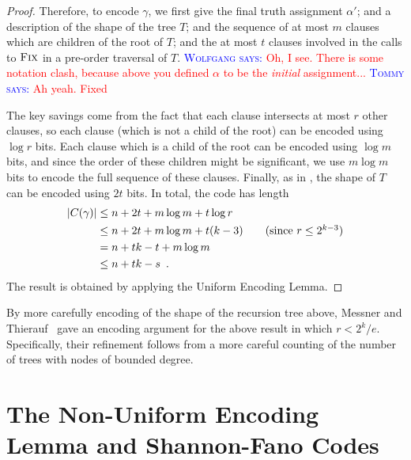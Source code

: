 \documentclass{patmorin}
\newcommand{\aremark}[3]{\textcolor{blue}{\textsc{#1 #2:}}
  \textcolor{red}{\textsf{#3}}}
\newcommand{\tommy}[2][says]{\aremark{Tommy}{#1}{#2}}
\newcommand{\wolfgang}[2][says]{\aremark{Wolfgang}{#1}{#2}}
\begin{document}
\begin{proof}
  Therefore, to encode $\gamma$, we first give the final truth
  assignment $\alpha'$; and a description of the shape of the tree
  $T$; and the sequence of at most $m$ clauses which are children of
  the root of $T$; and the at most $t$ clauses involved in the calls
  to $\textsc{Fix}$ in a pre-order traversal of $T$.  \wolfgang{Oh, I
    see. There is some notation clash, because above you defined
    $\alpha$ to be the \emph{initial} assignment...} \tommy{Ah
    yeah. Fixed}

  The key savings come from the fact that each clause intersects at
  most $r$ other clauses, so each clause (which is not a child of the
  root) can be encoded using $\log r$ bits. Each clause which is a
  child of the root can be encoded using $\log m$ bits, and since the
  order of these children might be significant, we use $m \log m$ bits
  to encode the full sequence of these clauses. Finally, as in
  , the shape of $T$ can be encoded
  using $2t$ bits. In total, the code has length
  \begin{align*}
    |C(\gamma)| &\le n + 2t + m\log m+ t \log r \\
    &\le n + 2t + m\log m + t(k - 3) \tag{since $r \le 2^{k - 3}$} \\
    &= n + tk - t + m\log m \\
    &\le n + tk - s \enspace .
  \end{align*}
  The result is obtained by applying the Uniform Encoding Lemma.
\end{proof}

\begin{rem}
  By more carefully encoding of the shape of the recursion tree above,
  Messner and Thierauf~\cite{messner:ksat} gave an encoding argument
  for the above result in which $r < 2^k/e$. Specifically, their 
  refinement follows
  from a more careful counting of the number of trees with nodes of
  bounded degree.
\end{rem}

\section{The Non-Uniform Encoding Lemma and Shannon-Fano Codes}
\end{document}
